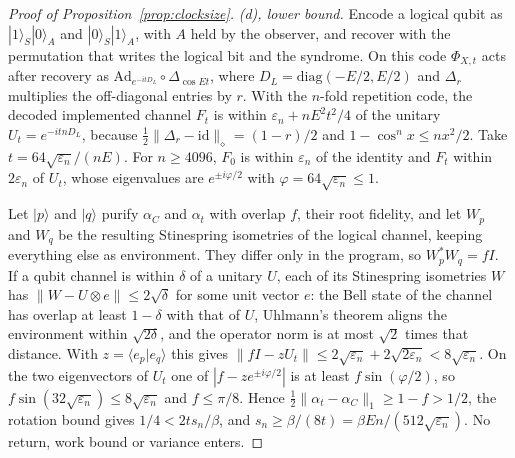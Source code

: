 \documentclass[11pt]{article}
\theoremstyle{definition}
\theoremstyle{remark}
\begin{document}
\begin{proof}[Proof of Proposition~\ref{prop:clocksize}]
\emph{(d), lower bound.} Encode a logical qubit as $|1\rangle_S|0\rangle_A$ and $|0\rangle_S|1\rangle_A$, with $A$ held by the observer, and recover with the permutation that writes the logical bit and the syndrome. On this code $\Phi_{X,t}$ acts after recovery as $\mathrm{Ad}_{e^{-itD_L}}\circ\Delta_{\cos Et}$, where $D_L=\mathrm{diag}(-E/2,E/2)$ and $\Delta_r$ multiplies the off-diagonal entries by $r$. With the $n$-fold repetition code, the decoded implemented channel $F_t$ is within $\varepsilon_n+nE^2t^2/4$ of the unitary $U_t=e^{-itnD_L}$, because $\frac12\|\Delta_r-\mathrm{id}\|_\diamond=(1-r)/2$ and $1-\cos^nx\le nx^2/2$. Take $t=64\sqrt{\varepsilon_n}/(nE)$. For $n\ge4096$, $F_0$ is within $\varepsilon_n$ of the identity and $F_t$ within $2\varepsilon_n$ of $U_t$, whose eigenvalues are $e^{\pm i\varphi/2}$ with $\varphi=64\sqrt{\varepsilon_n}\le1$.

Let $|p\rangle$ and $|q\rangle$ purify $\alpha_C$ and $\alpha_t$ with overlap $f$, their root fidelity, and let $W_p$ and $W_q$ be the resulting Stinespring isometries of the logical channel, keeping everything else as environment. They differ only in the program, so $W_p^*W_q=fI$. If a qubit channel is within $\delta$ of a unitary $U$, each of its Stinespring isometries $W$ has $\|W-U\otimes e\|\le2\sqrt\delta$ for some unit vector $e$: the Bell state of the channel has overlap at least $1-\delta$ with that of $U$, Uhlmann's theorem aligns the environment within $\sqrt{2\delta}$, and the operator norm is at most $\sqrt2$ times that distance. With $z=\langle e_p|e_q\rangle$ this gives $\|fI-zU_t\|\le2\sqrt{\varepsilon_n}+2\sqrt{2\varepsilon_n}<8\sqrt{\varepsilon_n}$. On the two eigenvectors of $U_t$ one of $|f-ze^{\pm i\varphi/2}|$ is at least $f\sin(\varphi/2)$, so $f\sin(32\sqrt{\varepsilon_n})\le8\sqrt{\varepsilon_n}$ and $f\le\pi/8$. Hence $\frac12\|\alpha_t-\alpha_C\|_1\ge1-f>1/2$, the rotation bound gives $1/4<2ts_n/\beta$, and $s_n\ge\beta/(8t)=\beta En/(512\sqrt{\varepsilon_n})$. No return, work bound or variance enters.


\end{proof}
\end{document}
